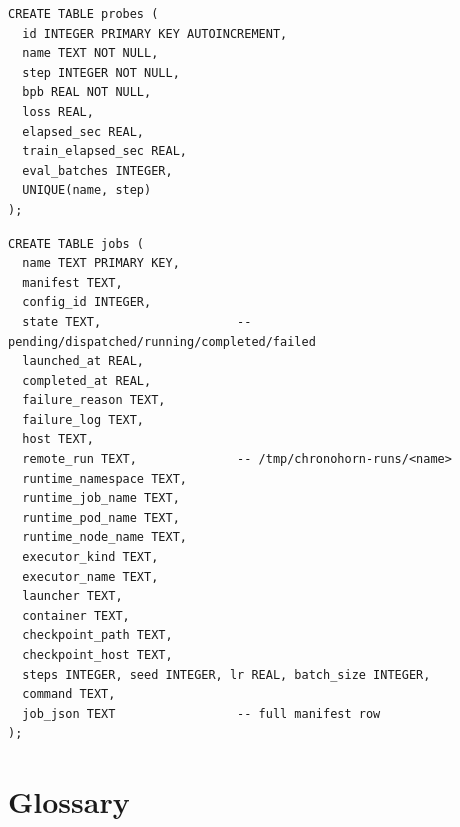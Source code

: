 \documentclass[11pt,openany]{book}
\theoremstyle{definition}
\theoremstyle{plain}
\begin{document}
\begin{lstlisting}[caption={probes},basicstyle=\ttfamily\footnotesize]
CREATE TABLE probes (
  id INTEGER PRIMARY KEY AUTOINCREMENT,
  name TEXT NOT NULL,
  step INTEGER NOT NULL,
  bpb REAL NOT NULL,
  loss REAL,
  elapsed_sec REAL,
  train_elapsed_sec REAL,
  eval_batches INTEGER,
  UNIQUE(name, step)
);
\end{lstlisting}

\begin{lstlisting}[caption={jobs},basicstyle=\ttfamily\footnotesize]
CREATE TABLE jobs (
  name TEXT PRIMARY KEY,
  manifest TEXT,
  config_id INTEGER,
  state TEXT,                   -- pending/dispatched/running/completed/failed
  launched_at REAL,
  completed_at REAL,
  failure_reason TEXT,
  failure_log TEXT,
  host TEXT,
  remote_run TEXT,              -- /tmp/chronohorn-runs/<name>
  runtime_namespace TEXT,
  runtime_job_name TEXT,
  runtime_pod_name TEXT,
  runtime_node_name TEXT,
  executor_kind TEXT,
  executor_name TEXT,
  launcher TEXT,
  container TEXT,
  checkpoint_path TEXT,
  checkpoint_host TEXT,
  steps INTEGER, seed INTEGER, lr REAL, batch_size INTEGER,
  command TEXT,
  job_json TEXT                 -- full manifest row
);
\end{lstlisting}

\chapter{Glossary}
\end{document}
